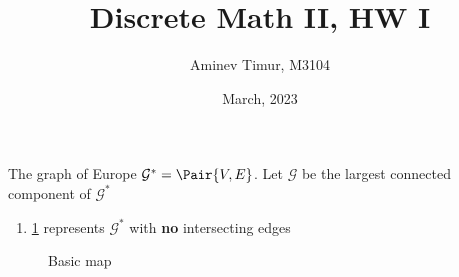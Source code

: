 \documentclass[12pt, a4paper]{article}
\title{Discrete Math II, HW I}
\date{March, 2023}
\author{Aminev Timur, M3104}
\newcommand\EGraph{\mathcal{G}^{*}}
\newcommand\EGraphL{\mathcal{G}}
\begin{document}
\maketitle

\problem The graph of Europe \(\EGraph = \Pair{V, E}\). Let \(\EGraphL\) be the
largest connected component of \(\EGraph\)

\begin{enumerate}[label=\alph*)]
\item \cref{fig:map_basic} represents \(\EGraph\) with \textbf{no} intersecting
      edges
\end{enumerate}



\begin{landscape}
\begin{figure}
\centering

\caption{Basic map}\label{fig:map_basic}
\end{figure}
\end{landscape}
\end{document}
